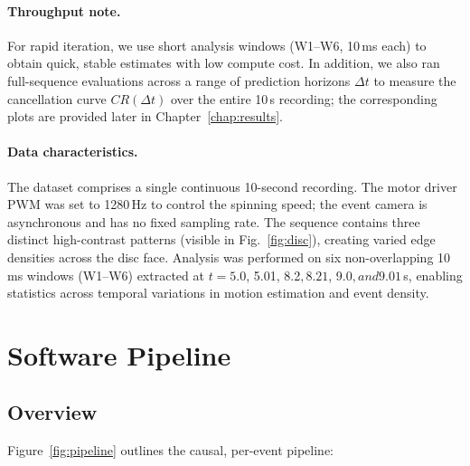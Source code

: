 \paragraph{Throughput note.}
For rapid iteration, we use short analysis windows (W1--W6, 10\,ms each) to obtain quick, stable estimates with low compute cost. In addition, we also ran full-sequence evaluations across a range of prediction horizons $\Delta t$ to measure the cancellation curve $CR(\Delta t)$ over the entire 10\,s recording; the corresponding plots are provided later in Chapter~\ref{chap:results}.

\paragraph{Data characteristics.}
The dataset comprises a single continuous 10-second recording. The motor driver PWM was set to 1280\,Hz to control the spinning speed; the event camera is asynchronous and has no fixed sampling rate. The sequence contains three distinct high-contrast patterns (visible in Fig.~\ref{fig:disc}), creating varied edge densities across the disc face. Analysis was performed on six non-overlapping 10\,ms windows (W1--W6) extracted at $t = 5.0$, 5.01, 8.2$, 8.21$, 9.0$, and 9.01$\,s, enabling statistics across temporal variations in motion estimation and event density.

\section{Software Pipeline}
\label{sec:software}

\subsection{Overview}
Figure~\ref{fig:pipeline} outlines the causal, per-event pipeline:

